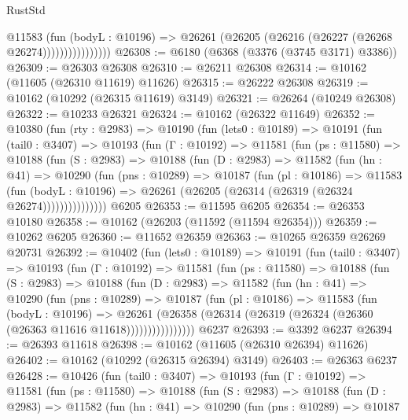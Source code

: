 \begin{lexlean}{RustStd}
\begin{coremodule}
                        @11583
                          (fun (bodyL : @10196) =>
                          @26261 (@26205 (@26216 (@26227 (@26268 @26274))))))))))))))))
@26308 := @6180 (@6368 (@3376 (@3745 @3171) @3386))
@26309 := @26303 @26308
@26310 := @26211 @26308
@26314 := @10162 (@11605 (@26310 @11619) @11626)
@26315 := @26222 @26308
@26319 := @10162 (@10292 (@26315 @11619) @3149)
@26321 := @26264 (@10249 @26308)
@26322 := @10233 @26321
@26324 := @10162 (@26322 @11649)
@26352 := @10380
    (fun (rty : @2983) =>
    @10190
      (fun (lets0 : @10189) =>
      @10191
        (fun (tail0 : @3407) =>
        @10193
          (fun (Γ : @10192) =>
          @11581
            (fun (ps : @11580) =>
            @10188
              (fun (S : @2983) =>
              @10188
                (fun (D : @2983) =>
                @11582
                  (fun (hn : @41) =>
                  @10290
                    (fun (pns : @10289) =>
                    @10187
                      (fun (pl : @10186) =>
                      @11583
                        (fun (bodyL : @10196) =>
                        @26261 (@26205 (@26314 (@26319 (@26324 @26274)))))))))))))))
    @6205
@26353 := @11595 @6205
@26354 := @26353 @10180
@26358 := @10162 (@26203 (@11592 (@11594 @26354)))
@26359 := @10262 @6205
@26360 := @11652 @26359
@26363 := @10265 @26359 @26269 @20731
@26392 := @10402
    (fun (lets0 : @10189) =>
    @10191
      (fun (tail0 : @3407) =>
      @10193
        (fun (Γ : @10192) =>
        @11581
          (fun (ps : @11580) =>
          @10188
            (fun (S : @2983) =>
            @10188
              (fun (D : @2983) =>
              @11582
                (fun (hn : @41) =>
                @10290
                  (fun (pns : @10289) =>
                  @10187
                    (fun (pl : @10186) =>
                    @11583
                      (fun (bodyL : @10196) =>
                      @26261
                        (@26358
                          (@26314 (@26319 (@26324 (@26360 (@26363 @11616 @11618))))))))))))))))
    @6237
@26393 := @3392 @6237
@26394 := @26393 @11618
@26398 := @10162 (@11605 (@26310 @26394) @11626)
@26402 := @10162 (@10292 (@26315 @26394) @3149)
@26403 := @26363 @6237
@26428 := @10426
    (fun (tail0 : @3407) =>
    @10193
      (fun (Γ : @10192) =>
      @11581
        (fun (ps : @11580) =>
        @10188
          (fun (S : @2983) =>
          @10188
            (fun (D : @2983) =>
            @11582
              (fun (hn : @41) =>
              @10290
                (fun (pns : @10289) =>
                @10187

\end{coremodule}
\end{lexlean}
